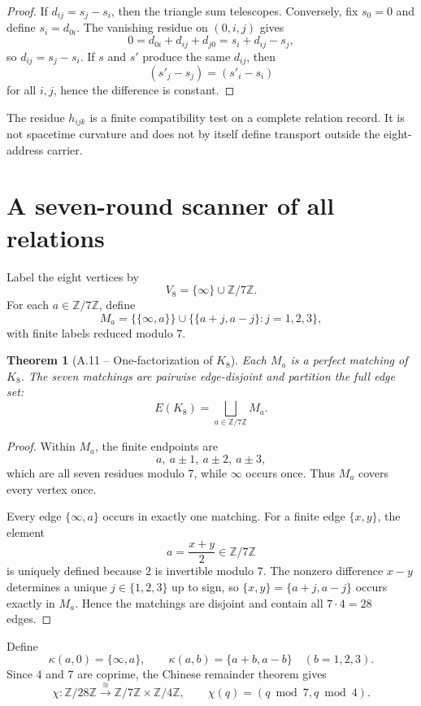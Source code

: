 \documentclass[11pt,letterpaper]{article}
\theoremstyle{relationstyle}
\newtheorem{theorem}{Theorem}[section]
\newcommand{\Z}{\mathbb{Z}}
\newcommand{\Zfour}{\Z/4\Z}
\newcommand{\Zseven}{\Z/7\Z}
\newcommand{\Ztwentyeight}{\Z/28\Z}
\begin{document}
\begin{proof}
If $d_{ij}=s_j-s_i$, then the triangle sum telescopes.  Conversely, fix $s_0=0$ and define $s_i=d_{0i}$.  The vanishing residue on $(0,i,j)$ gives
\[
0=d_{0i}+d_{ij}+d_{j0}=s_i+d_{ij}-s_j,
\]
so $d_{ij}=s_j-s_i$.  If $s$ and $s'$ produce the same $d_{ij}$, then
\[
(s'_j-s_j)=(s'_i-s_i)
\]
for all $i,j$, hence the difference is constant.
\end{proof}

The residue $h_{ijk}$ is a finite compatibility test on a complete relation record.  It is not spacetime curvature and does not by itself define transport outside the eight-address carrier.

\section{A seven-round scanner of all relations}\label{sec:scanner}

Label the eight vertices by
\[
V_8=\{\infty\}\cup\Zseven.
\]
For each $a\in\Zseven$, define
\begin{equation}\label{eq:matching}
M_a=
\bigl\{\{\infty,a\}\bigr\}
\cup
\bigl\{\{a+j,a-j\}:j=1,2,3\bigr\},
\end{equation}
with finite labels reduced modulo $7$.

\begin{theorem}[A.11 -- One-factorization of $K_8$]\label{thm:factor}
Each $M_a$ is a perfect matching of $K_8$.  The seven matchings are pairwise edge-disjoint and partition the full edge set:
\[
E(K_8)=\bigsqcup_{a\in\Zseven}M_a.
\]
\end{theorem}

\begin{proof}
Within $M_a$, the finite endpoints are
\[
a,\ a\pm1,\ a\pm2,\ a\pm3,
\]
which are all seven residues modulo $7$, while $\infty$ occurs once.  Thus $M_a$ covers every vertex once.

Every edge $\{\infty,a\}$ occurs in exactly one matching.  For a finite edge $\{x,y\}$, the element
\[
a=\frac{x+y}{2}\in\Zseven
\]
is uniquely defined because $2$ is invertible modulo $7$.  The nonzero difference $x-y$ determines a unique $j\in\{1,2,3\}$ up to sign, so $\{x,y\}=\{a+j,a-j\}$ occurs exactly in $M_a$.  Hence the matchings are disjoint and contain all $7\cdot4=28$ edges.
\end{proof}

Define
\[
\kappa(a,0)=\{\infty,a\},
\qquad
\kappa(a,b)=\{a+b,a-b\}
\quad(b=1,2,3).
\]
Since $4$ and $7$ are coprime, the Chinese remainder theorem gives
\[
\chi:\Ztwentyeight\overset{\cong}{\longrightarrow}\Zseven\times\Zfour,
\qquad
\chi(q)=(q\bmod7,q\bmod4).
\]
\end{document}
